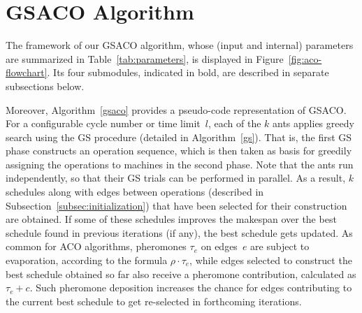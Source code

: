 \documentclass[runningheads]{llncs}
\begin{document}
\section{GSACO Algorithm}
\label{sec:gsaco}

The framework of our %
GSACO algorithm, whose (input and internal) parameters are summarized in Table~\ref{tab:parameters},
is displayed in Figure~\ref{fig:aco-flowchart}.
Its four submodules, indicated in bold, are described in separate subsections below.

Moreover, Algorithm~\ref{gsaco} provides a pseudo-code representation of
GSACO.
For a configurable cycle number or time limit~$l$,
each of the $k$ ants applies greedy search
using the GS procedure (detailed in Algorithm~\ref{gs}).
That is, the first GS phase constructs an operation sequence, which is
then taken as basis for greedily assigning the operations to machines
in the second phase.   
Note that the ants run independently, so that their GS trials
can be performed in parallel.
As a result, $k$ schedules along with edges between operations
(described in Subsection~\ref{subsec:initialization})
that have been selected for their construction are obtained.
If some of these schedules improves the makespan over the best
schedule found in previous iterations (if any),
the best schedule gets updated.
As common for ACO algorithms,
pheromones $\tau_e$ on edges~$e$ are subject to evaporation,
according to the formula $\rho\cdot\tau_e$,
while edges selected to construct the best schedule obtained
so far also receive a pheromone contribution,
calculated as $\tau_e+c$.
Such pheromone deposition increases the chance for edges contributing to the
current best schedule
to get re-selected %
in forthcoming iterations.
\end{document}
